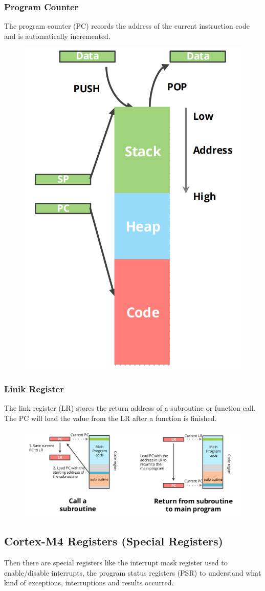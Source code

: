 \subsubsection{Program Counter}

The program counter (PC) records the address of the current instruction code and is automatically
incremented.

\begin{figure}[H]
    \centering
    \includegraphics[width=0.25\linewidth]{img/image17.png}
\end{figure}

\subsubsection{Linik Register}
The link register (LR) stores the return address of a subroutine or function call. The PC will load the
value from the LR after a function is finished.

\begin{figure}[H]
    \centering
    \includegraphics[width=0.85\linewidth]{img/image18.png}
\end{figure}

\subsection{Cortex-M4 Registers (Special Registers)}
Then there are special registers like the interrupt mask register used to enable/disable interrupts, the
program status registers (PSR) to understand what kind of exceptions, interruptions and results occurred.

